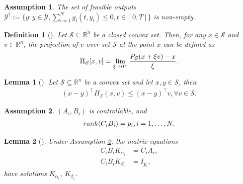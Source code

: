 \documentclass[letterpaper, 10 pt, conference]{ieeeconf}  %
\newtheorem{assumption}{ {Assumption}}
\newtheorem{lemma}{ {Lemma}}
\newtheorem{definition}{ {Definition}}
\begin{document}
\begin{assumption}
	The set of feasible outputs $\mathcal{Y}^\dagger:=\{y: y\in\mathcal{Y}, \sum_{i=1}^{N}g_{i}(t, y_i)\le 0, t\in[0,T]\}$ is non-empty.
\end{assumption}	

\begin{definition} [\cite{zhang1995}]
	Let $\mathcal{S} \subseteq \mathbb{R}^n$ be a closed convex set. Then, for any $x \in \mathcal{S}$ and $v\in\mathbb{R}^n$, the projection of $v$ over set $\mathcal{S}$ at the point $x$ can be defined as
	\begin{align}
		\Pi_\mathcal{S} [x,v] = \lim\limits_{\xi\to0^+} \frac{P_\mathcal{S}(x+\xi v)-x}{\xi}.\notag
	\end{align}
\end{definition}

\begin{lemma} [\cite{pater2017}]
	Let $\mathcal{S} \subseteq \mathbb{R}^n$ be a convex set and let $x, y\in \mathcal{S}$, then
	\begin{align}
		(x-y)^\top \Pi_{\mathcal{S}}(x,v)\le (x-y)^\top v, \forall v\in \mathcal{S}.\label{eqle2}
	\end{align}
\end{lemma}


\begin{assumption} \label{asp4}
	$(A_i,B_i)$ is controllable, and
	\begin{align}
		rank(C_iB_i)=p_i, i=1,\dots,N.\notag
	\end{align}
\end{assumption}

\begin{lemma} [\cite{yu2021}]\label{lemma3}
	Under Assumption \ref{asp4}, the matrix equations
	\begin{subequations}\label{eqle3}
		\begin{align}
			C_iB_iK_{\alpha_i}&=C_iA_i,\label{eqle31}\\
			C_iB_iK_{\beta_i}&=I_{p_i},\label{eqle32}
		\end{align}
	\end{subequations}
	have solutions $K_{\alpha_i}$, $K_{\beta_i}$.
\end{lemma}
\end{document}
